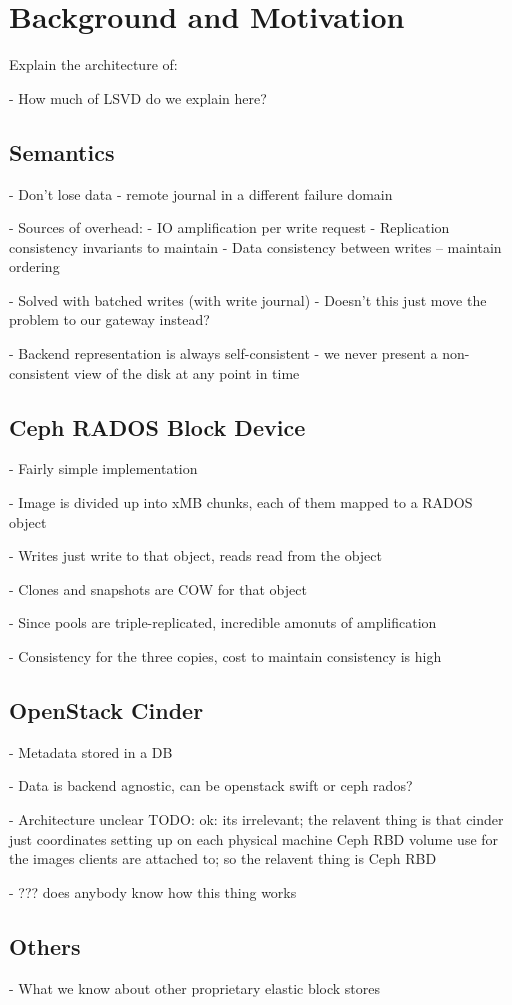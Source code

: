 \section{Background and Motivation}

Explain the architecture of:

- How much of LSVD do we explain here?

\subsection{Semantics}

- Don't lose data - remote journal in a different failure domain

- Sources of overhead: 
    - IO amplification per write request
    - Replication consistency invariants to maintain
    - Data consistency between writes -- maintain ordering

- Solved with batched writes (with write journal)
    - Doesn't this just move the problem to our gateway instead?

- Backend representation is always self-consistent - we never present a non-consistent
  view of the disk at any point in time

\subsection{Ceph RADOS Block Device}

- Fairly simple implementation

- Image is divided up into xMB chunks, each of them mapped to a RADOS object

- Writes just write to that object, reads read from the object

- Clones and snapshots are COW for that object

- Since pools are triple-replicated, incredible amonuts of amplification

- Consistency for the three copies, cost to maintain consistency is high

\subsection{OpenStack Cinder}

- Metadata stored in a DB

- Data is backend agnostic, can be openstack swift or ceph rados?

- Architecture unclear TODO: ok: its irrelevant; the relavent thing is that cinder just coordinates setting up on each physical machine Ceph RBD volume use for the images clients are attached to; so the relavent thing is Ceph RBD

- ??? does anybody know how this thing works

\subsection{Others}

- What we know about other proprietary elastic block stores
